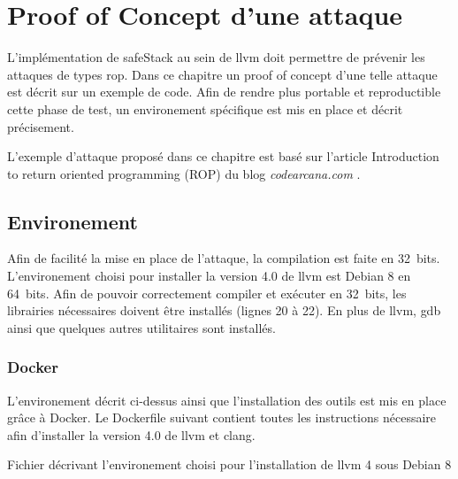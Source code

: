 \chapter{Proof of Concept d'une attaque}
\label{chap:attaque}

L'implémentation de \gls{safeStack} au sein de \gls{llvm} doit permettre de prévenir les attaques de types \gls{rop}. Dans ce chapitre un \og proof of concept \fg d'une telle attaque est décrit sur un exemple de code. Afin de rendre plus portable et reproductible cette phase de test, un environement spécifique est mis en place et décrit précisement.

L'exemple d'attaque proposé dans ce chapitre est basé sur l'article \og Introduction to return oriented programming (ROP) \fg du blog \textit{codearcana.com} \cite{IntroductionToROP}.

\minitoc

\newpage

\section{Environement}

%
%

Afin de facilité la mise en place de l'attaque, la compilation est faite en 32~bits. L'environement choisi pour installer la version 4.0 de \gls{llvm} est Debian 8 en 64~bits. Afin de pouvoir correctement compiler et exécuter en 32~bits, les librairies nécessaires doivent être installés (lignes 20 à 22). En plus de \gls{llvm}, \gls{gdb} ainsi que quelques autres utilitaires sont installés.

\subsection{Docker}

L'environement décrit ci-dessus ainsi que l'installation des outils est mis en place grâce à Docker. Le Dockerfile suivant contient toutes les instructions nécessaire afin d'installer la version 4.0 de \gls{llvm} et \gls{clang}.

\begin{listing}
	\caption{Fichier décrivant l'environement choisi pour l'installation de \gls{llvm} 4 sous Debian 8}
	\label{lst:dockerfile}
\end{listing}

